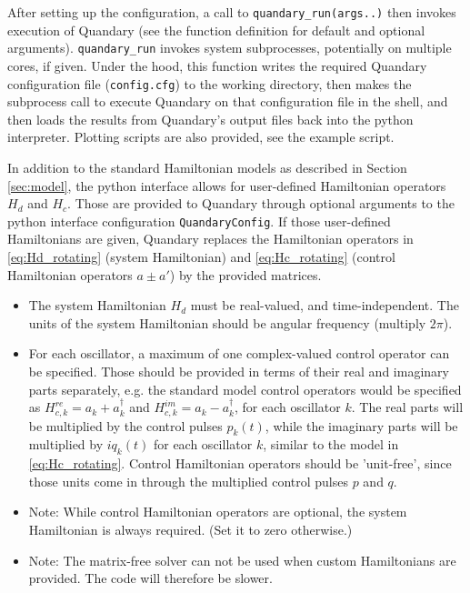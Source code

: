 \documentclass[11pt]{article}
\begin{document}
After setting up the configuration, a call to \texttt{quandary\_run(args..)} then invokes execution of Quandary (see the function definition for default and optional arguments). \texttt{quandary\_run} invokes system subprocesses, potentially on multiple cores, if given. Under the hood, this function writes the required Quandary configuration file (\texttt{config.cfg}) to the working directory, then makes the subprocess call to execute Quandary on that configuration file in the shell, and then loads the results from Quandary's output files back into the python interpreter. Plotting scripts are also provided, see the example script. 

In addition to the standard Hamiltonian models as described in Section \ref{sec:model}, the python interface allows for user-defined Hamiltonian operators $H_d$ and $H_c$. Those are provided to Quandary through optional arguments to the python interface configuration \texttt{QuandaryConfig}. If those user-defined Hamiltonians are given, Quandary replaces the Hamiltonian operators in \eqref{eq:Hd_rotating} (system Hamiltonian) and \eqref{eq:Hc_rotating} (control Hamiltonian operators $a\pm a'$) by the provided matrices.
\begin{itemize}
  \item The system Hamiltonian $H_d$ must be real-valued, and time-independent. The units of the system Hamiltonian should be angular frequency (multiply $2\pi$). 
  \item For each oscillator, a maximum of one complex-valued control operator can be specified. Those should be provided in terms of their real and imaginary parts separately, e.g. the standard model control operators would be specified as $H_{c,k}^{re} = a_k+a_k^\dagger$ and $H_{c,k}^{im}=a_k-a_k^\dagger$, for each oscillator $k$. The real parts will be multiplied by the control pulses $p_k(t)$, while the imaginary parts will be multiplied by $iq_k(t)$ for each oscillator $k$, similar to the model in \eqref{eq:Hc_rotating}. Control Hamiltonian operators should be 'unit-free', since those units come in through the multiplied control pulses $p$ and $q$.
  \item Note: While control Hamiltonian operators are optional, the system Hamiltonian is always required. (Set it to zero otherwise.)
  \item Note: The matrix-free solver can not be used when custom Hamiltonians are provided. The code will therefore be slower. 
\end{itemize}
\end{document}

